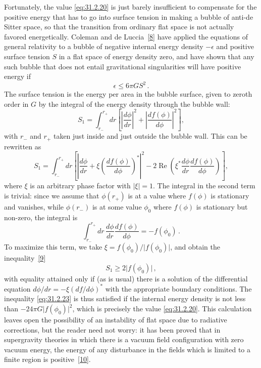 Fortunately, the value \eqref{eq:31.2.20} is just barely insufficient to
compensate for the positive energy that has to go into surface tension in
making a bubble of anti-de Sitter space, so that the transition from ordinary
flat space is not actually favored energetically. Coleman and de
Luccia~\hyperref[ch31-ref-8]{[8]} have applied the equations of general
relativity to a bubble of negative internal energy density \(-\epsilon\) and
positive surface tension \(S\) in a flat space of energy density zero, and
have shown that any such bubble that does not entail gravitational
singularities will have positive energy if
\begin{equation}
  \epsilon\leq 6\pi GS^2\,.
  \tag{31.2.23}\label{eq:31.2.23}
\end{equation}
The surface tension is the energy per area in the bubble surface, given to
zeroth order in \(G\) by the integral of the energy density through the bubble
wall:
\begin{equation}
  S_1
  =\int_{r_-}^{r_+}dr
   \left[
     \left\lvert\frac{d\phi}{dr}\right\rvert^2
     +\left\lvert\frac{df(\phi)}{d\phi}\right\rvert^2
   \right],
  \tag{31.2.24}\label{eq:31.2.24}
\end{equation}
with \(r_-\) and \(r_+\) taken just inside and just outside the bubble wall.
This can be rewritten as
\[
  S_1
  =\int_{r_-}^{r_+}dr
   \left[
     \left\lvert
       \frac{d\phi}{dr}
       +\xi\left(\frac{df(\phi)}{d\phi}\right)^*
     \right\rvert^2
     -2\operatorname{Re}\left(
       \xi^*\frac{d\phi}{dr}\frac{df(\phi)}{d\phi}
     \right)
   \right],
\]
where \(\xi\) is an arbitrary phase factor with \(\lvert\xi\rvert=1\). The
integral in the second term is trivial: since we assume that \(\phi(r_+)\) is
at a value where \(f(\phi)\) is stationary and vanishes, while \(\phi(r_-)\)
is at some value \(\phi_0\) where \(f(\phi)\) is stationary but non-zero, the
integral is
\[
  \int_{r_-}^{r_+}dr\,
  \frac{d\phi}{dr}\frac{df(\phi)}{d\phi}
  =-f(\phi_0)\,.
\]
To maximize this term, we take
\(\xi=f(\phi_0)/\lvert f(\phi_0)\rvert\), and obtain the
inequality~\hyperref[ch31-ref-9]{[9]}
\begin{equation}
  S_1\geq 2\lvert f(\phi_0)\rvert\,,
  \tag{31.2.25}\label{eq:31.2.25}
\end{equation}
with equality attained only if (as is usual) there is a solution of the
differential equation
\(d\phi/dr=-\xi(df/d\phi)^*\) with the appropriate boundary conditions. The
inequality \eqref{eq:31.2.23} is thus satisfied if the internal energy density
is not less than \(-24\pi G\lvert f(\phi_0)\rvert^2\), which is precisely the
value \eqref{eq:31.2.20}. This calculation leaves open the possibility of an
instability of flat space due to radiative corrections, but the reader need
not worry: it has been proved that in supergravity theories in which there is
a vacuum field configuration with zero vacuum energy, the energy of any
disturbance in the fields which is limited to a finite region is
positive~\hyperref[ch31-ref-10]{[10]}.

